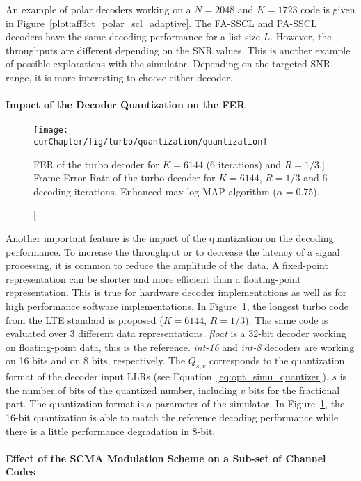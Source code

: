 An example of polar decoders working on a $N = 2048$ and $K = 1723$ code is
given in Figure~\ref{plot:aff3ct_polar_scl_adaptive}. The FA-SSCL and PA-SSCL
decoders have the same decoding performance for a list size $L$. However,
the throughputs are different depending on the SNR values. This is another
example of possible explorations with the \AFFECT simulator. Depending on the
targeted SNR range, it is more interesting to choose either decoder.

\paragraph{Impact of the Decoder Quantization on the FER}

\begin{figure}[htp]
  \centering
  \texttt{[image: \\curChapter/fig/turbo/quantization/quantization]}
  \caption
    [FER of the turbo decoder for $K = 6144$ (6 iterations) and
     $R=1/3$.]
    {Frame Error Rate of the turbo decoder for $K = 6144$, $R=1/3$ and 6
     decoding iterations. Enhanced max-log-MAP algorithm ($\alpha = 0.75$).}
  \label{plot:aff3ct_turbo_quantization}
\end{figure}

Another important feature is the impact of the quantization on the decoding
performance. To increase the throughput or to decrease the latency of a signal
processing, it is common to reduce the amplitude of the data. A fixed-point
representation can be shorter and more efficient than a floating-point
representation. This is true for hardware decoder implementations as well as for
high performance software implementations. In
Figure~\ref{plot:aff3ct_turbo_quantization}, the longest turbo code from the
LTE standard is proposed ($K = 6144$, $R = 1/3$). The same code is evaluated
over 3 different data representations. \emph{float} is a 32-bit decoder working
on floating-point data, this is the reference. \emph{int-16} and \emph{int-8}
decoders are working on 16 bits and on 8 bits, respectively. The $Q_{s,v}$
corresponds to the quantization format of the decoder input LLRs (see
Equation~\ref{eq:opt_simu_quantizer}). $s$ is the number of bits of the
quantized number, including $v$ bits for the fractional part. The quantization
format is a parameter of the \AFFECT simulator. In
Figure~\ref{plot:aff3ct_turbo_quantization}, the 16-bit quantization is able
to match the reference decoding performance while there is a little performance
degradation in 8-bit.

\paragraph{Effect of the SCMA Modulation Scheme on a Sub-set of Channel Codes}

